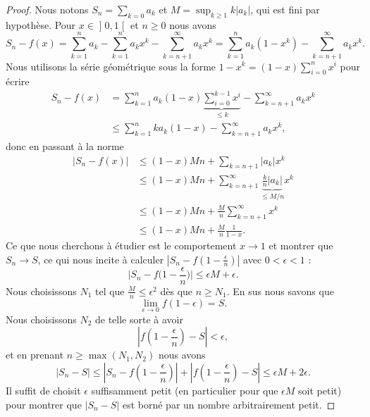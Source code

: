 \begin{proof}
    Nous notons \( S_n=\sum_{k=0}a_k\) et \( M=\sup_{k\geq 1}k| a_k |\), qui est fini par hypothèse. Pour \( x\in \mathopen] 0 , 1 \mathclose[\) et \( n\geq 0\) nous avons
    \begin{equation}
        S_n-f(x)=\sum_{k=1}^na_k-\sum_{k=1}^na_kx^k-\sum_{k=n+1}^{\infty}a_kx^k=\sum_{k=1}^na_k(1-x^k)-\sum_{k=n+1}^{\infty}a_kx^k.
    \end{equation}
    Nous utilisons la série géométrique sous la forme \( 1-x^k=(1-x)\sum_{i=0}^nx^i\) pour écrire
    \begin{subequations}
        \begin{align}
            S_n-f(x)&=\sum_{k=1}^na_k(1-x)\underbrace{\sum_{i=0}^{k-1}x^i}_{\leq k}-\sum_{k=n+1}^{\infty}a_kx^k\\
            &\leq\sum_{k=1}^nka_k(1-x)-\sum_{k=n+1}^{\infty}a_kx^k,
        \end{align}
    \end{subequations}
    donc en passant à la norme
    \begin{subequations}
        \begin{align}
            \big| S_n-f(x) \big|&\leq (1-x)Mn+\sum_{k=n+1}| a_k |x^k\\
            &\leq (1-x)Mn+\sum_{k=n+1}^{\infty}\underbrace{\frac{ k }{ n }| a_k |}_{\leq M/n}x^k\\
            &\leq (1-x)Mn+\frac{ M }{ n }\sum_{k=n+1}^{\infty}x^k\\
            &\leq (1-x)Mn+\frac{ M }{ n }\frac{1}{ 1-x }.
        \end{align}
    \end{subequations}
    Ce que nous cherchons à étudier est le comportement \( x\to 1\) et montrer que \( S_n\to S\), ce qui nous incite à calculer \( | S_n-f(1-\frac{ \epsilon }{n  }) |\) avec \( 0<\epsilon<1\) :
    \begin{equation}
        \big| S_n-f\big( 1-\frac{ \epsilon }{ n } \big) \big|\leq \epsilon M+\epsilon.
    \end{equation}
    Nous choisissons \( N_1\) tel que \( \frac{ M }{ n }\leq \epsilon^2\) dès que \( n\geq N_1\). En sus nous savons que 
    \begin{equation}
        \lim_{\epsilon\to 0}f(1-\epsilon)=S.
    \end{equation}
    Nous choisissons \( N_2\) de telle sorte à avoir
    \begin{equation}
        \left| f\left( 1-\frac{ \epsilon }{ n } \right)-S \right| <\epsilon,
    \end{equation}
    et en prenant \( n\geq\max(N_1,N_2)\) nous avons
    \begin{equation}
        | S_n-S |\leq \left| S_n-f\left( 1-\frac{ \epsilon }{ n } \right) \right| +\left| f\left( 1-\frac{ \epsilon }{ n } \right)-S \right|  \leq \epsilon M+2\epsilon.
    \end{equation}
    Il suffit de choisit \( \epsilon\) suffisamment petit (en particulier pour que \( \epsilon M\) soit petit) pour montrer que \( | S_n-S |\) est borné par un nombre arbitrairement petit.
\end{proof}
